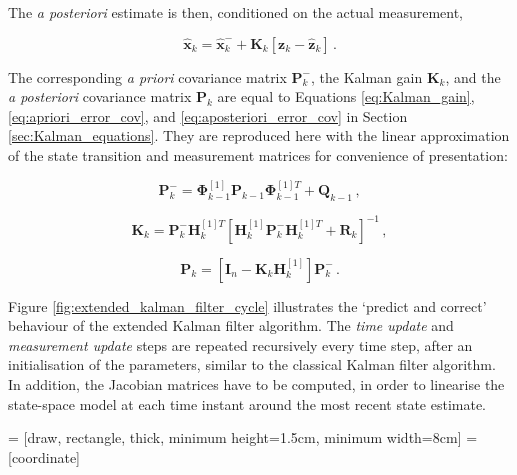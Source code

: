 \noindent
The \emph{a posteriori} estimate is then, conditioned on the actual measurement, 

\begin{equation}\label{eq:aposteriori_estimate_extended}
  \hat{\bm{x}}_k = \hat{\bm{x}}^-_k + \bm{K}_{k}[\bm{z}_k-\hat{\bm{z}}_k]\,.
\end{equation}

\noindent
The corresponding \emph{a priori} covariance matrix $\bm{P}^-_{k}$, the Kalman gain $\bm{K}_{k}$, and the \emph{a posteriori} covariance matrix $\bm{P}_{k}$ are equal to Equations \ref{eq:Kalman_gain}, \ref{eq:apriori_error_cov}, and \ref{eq:aposteriori_error_cov} in Section \ref{sec:Kalman_equations}. They are reproduced here with the linear approximation of the state transition and measurement matrices for convenience of presentation:

\begin{equation}\label{eq:apriori_error_cov_extended}
  \bm{P}^-_{k} = \bm{\Phi}^{[1]}_{k-1} \bm{P}_{k-1} \bm{\Phi}^{[1]T}_{k-1} + \bm{Q}_{k-1}\,,
\end{equation}

\begin{equation}\label{eq:Kalman_gain_extended}
  \bm{K}_{k} = \bm{P}^-_k \bm{H}^{[1]T}_k[\bm{H}^{[1]}_k \bm{P}^-_k \bm{H}^{[1]T}_k + \bm{R}_k]^{-1}\,,
\end{equation}

\begin{equation}\label{eq:aposteriori_error_cov_extended}
  \bm{P}_{k} = [\bm{I}_n - \bm{K}_{k}\bm{H}^{[1]}_{k}]\bm{P}^-_{k}\,.
\end{equation}

Figure \ref{fig:extended_kalman_filter_cycle} illustrates the `predict and correct' behaviour of the extended Kalman filter algorithm. The \emph{time update} and \emph{measurement update} steps are repeated recursively every time step, after an initialisation of the parameters, similar to the classical Kalman filter algorithm. In addition, the Jacobian matrices have to be computed, in order to linearise the state-space model at each time instant around the most recent state estimate.

 = [draw, rectangle, thick, 
    minimum height=1.5cm, minimum width=8cm]
 = [coordinate]

